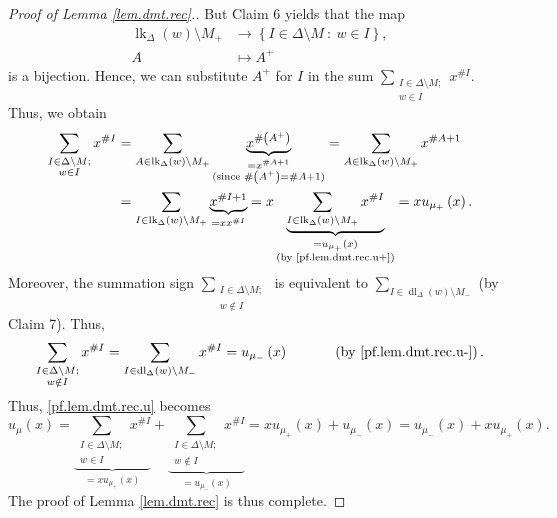 \documentclass[12pt]{amsart}
\theoremstyle{definition}
\DeclareMathOperator{\lk}{lk}
\DeclareMathOperator{\dl}{dl}
\begin{document}
\begin{proof}[Proof of Lemma \ref{lem.dmt.rec}.]
But Claim 6 yields that the map%
\begin{align*}
\lk_{\Delta}\left(  w\right)  \setminus M_+  &
\rightarrow\left\{  I\in\Delta\setminus M\ :\ w\in I\right\}  ,\\
A  &  \mapsto A^+%
\end{align*}
is a bijection. Hence, we can substitute $A^+$ for $I$ in the sum
$\sum\limits_{\substack{I\in\Delta\setminus M;\\w\in I}}x^{\#I}$. Thus, we
obtain
\begin{align*}
\sum_{\substack{I\in\Delta\setminus M;\\w\in I}}x^{\#I}  &  =\sum
_{A\in\lk_{\Delta}\left(  w\right)  \setminus M_+%
}\underbrace{x^{\#\left(  A^+\right)  }}_{\substack{=x^{\#A+1}\\\text{(since
}\#\left(  A^+\right)  =\#A+1\text{)}}}
=\sum_{A\in\lk_{\Delta}\left(  w\right)  \setminus M_+}x^{\#A+1}\\
&  =\sum_{I\in\lk_{\Delta}\left(  w\right)  \setminus
M_+}\underbrace{x^{\#I+1}}_{=xx^{\#I}}=x\underbrace{\sum_{I\in
\lk_{\Delta}\left(  w\right)  \setminus M_+}x^{\#I}%
}_{\substack{=u_{\mu_+}\left(  x\right)  \\\text{(by
\eqref{pf.lem.dmt.rec.u+})}}}=xu_{\mu_+}\left(  x\right)  .
\end{align*}
Moreover, the summation sign $\sum\limits_{\substack{I\in\Delta\setminus
M;\\w\notin I}}$ is equivalent to
$\sum\limits_{I\in\dl_{\Delta}\left(  w\right)  \setminus M_-}$
(by Claim 7). Thus,
\[
\sum_{\substack{I\in\Delta\setminus M;\\w\notin I}}x^{\#I}
= \sum\limits_{I\in \dl_{\Delta}\left(  w\right)  \setminus M_-}
x^{\#I}
=u_{\mu_-}\left(  x\right)  \ \ \ \ \ \ \ \ \ \ \left(  \text{by
\eqref{pf.lem.dmt.rec.u-}}\right)  .
\]
Thus, \eqref{pf.lem.dmt.rec.u} becomes
\[
u_{\mu}\left(  x\right)  =\underbrace{\sum_{\substack{I\in\Delta\setminus
M;\\w\in I}}x^{\#I}}_{=xu_{\mu_+}\left(  x\right)  }+\underbrace{\sum
_{\substack{I\in\Delta\setminus M;\\w\notin I}}x^{\#I}}_{=u_{\mu_-}\left(
x\right)  }=xu_{\mu_+}\left(  x\right)  +u_{\mu_-}\left(  x\right)
=u_{\mu_-}\left(  x\right)  +xu_{\mu_+}\left(  x\right)  .
\]
The proof of Lemma \ref{lem.dmt.rec} is thus complete.
\end{proof}

\printbibliography
\end{document}
